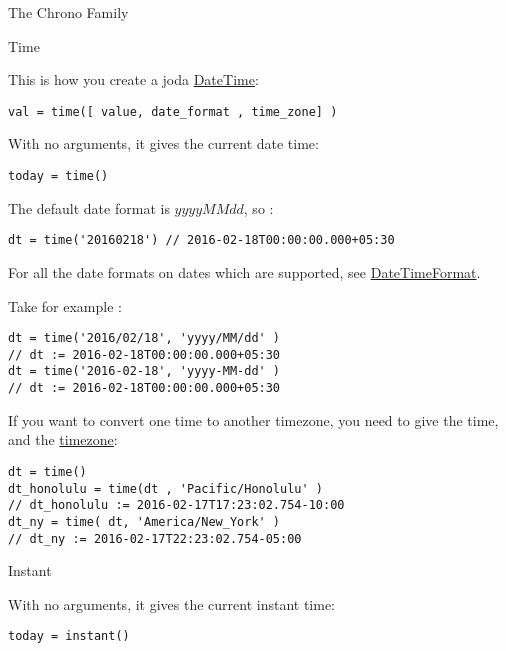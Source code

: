\begin{section}{The Chrono Family}
\begin{subsection}{Time}

This is how you create a joda \href{http://joda-time.sourceforge.net/apidocs/org/joda/time/DateTime.html}{DateTime}:
\begin{lstlisting}[style=JexlStyle]
val = time([ value, date_format , time_zone] )
\end{lstlisting}

With no arguments, it gives the current date time:

\begin{lstlisting}[style=JexlStyle]
today = time()
\end{lstlisting}

The default date format is $yyyyMMdd$, so :
\begin{lstlisting}[style=JexlStyle]
dt = time('20160218') // 2016-02-18T00:00:00.000+05:30
\end{lstlisting}

For all the date formats on dates which are supported, 
see \href{http://www.joda.org/joda-time/apidocs/org/joda/time/format/DateTimeFormat.html}{DateTimeFormat}.

Take for example :

\begin{lstlisting}[style=JexlStyle]
dt = time('2016/02/18', 'yyyy/MM/dd' ) 
// dt := 2016-02-18T00:00:00.000+05:30
dt = time('2016-02-18', 'yyyy-MM-dd' ) 
// dt := 2016-02-18T00:00:00.000+05:30
\end{lstlisting}

If you want to convert one time to another timezone, you need to give the time, 
and the \href{http://joda-time.sourceforge.net/timezones.html}{timezone}:

\begin{lstlisting}[style=JexlStyle]
dt = time()
dt_honolulu = time(dt , 'Pacific/Honolulu' ) 
// dt_honolulu := 2016-02-17T17:23:02.754-10:00 
dt_ny = time( dt, 'America/New_York' ) 
// dt_ny := 2016-02-17T22:23:02.754-05:00
\end{lstlisting}

\end{subsection}


\begin{subsection}{Instant}

With no arguments, it gives the current instant time:

\begin{lstlisting}[style=JexlStyle]
today = instant()
\end{lstlisting}


\end{subsection}
\end{section}

